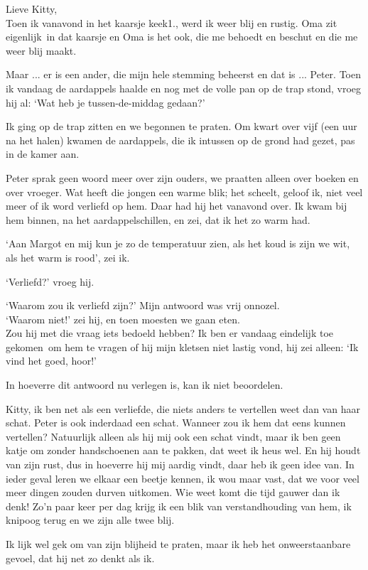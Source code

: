 \documentclass{book}
\begin{document}
Lieve Kitty,\\Toen ik vanavond in het kaarsje keek1., werd ik weer blij
en rustig. Oma zit eigenlijk~in dat kaarsje en Oma is het ook, die me
behoedt en beschut en die me weer blij maakt.

Maar ... er is een ander, die mijn hele stemming beheerst en dat is ...
Peter. Toen ik vandaag de aardappels haalde en nog met de volle pan op
de trap stond, vroeg hij al: `Wat heb je tussen-de-middag gedaan?'

Ik ging op de trap zitten en we begonnen te praten. Om kwart over vijf
(een uur na het halen) kwamen de aardappels, die ik intussen op de grond
had gezet, pas in de kamer aan.

Peter sprak geen woord meer over zijn ouders, we praatten alleen over
boeken en over vroeger. Wat heeft die jongen een warme blik; het
scheelt, geloof ik, niet veel meer of ik word verliefd op hem. Daar had
hij het vanavond over. Ik kwam bij hem binnen, na het aardappelschillen,
en zei, dat ik het zo warm had.

`Aan Margot en mij kun je zo de temperatuur zien, als het koud is zijn
we wit, als het warm is rood', zei ik.

`Verliefd?' vroeg hij.

`Waarom zou ik verliefd zijn?' Mijn antwoord was vrij onnozel.\\`Waarom
niet!' zei hij, en toen moesten we gaan eten.\\Zou hij met die vraag
iets bedoeld hebben? Ik ben er vandaag eindelijk toe gekomen~om hem te
vragen of hij mijn kletsen niet lastig vond, hij zei alleen: `Ik vind
het goed, hoor!'

In hoeverre dit antwoord nu verlegen is, kan ik niet beoordelen.

Kitty, ik ben net als een verliefde, die niets anders te vertellen weet
dan van haar schat. Peter is ook inderdaad een schat. Wanneer zou ik hem
dat eens kunnen vertellen? Natuurlijk alleen als hij mij ook een schat
vindt, maar ik ben geen katje om zonder handschoenen aan te pakken, dat
weet ik heus wel. En hij houdt van zijn rust, dus in hoeverre hij mij
aardig vindt, daar heb ik geen idee van. In ieder geval leren we elkaar
een beetje kennen, ik wou maar vast, dat we voor veel meer dingen zouden
durven uitkomen. Wie weet komt die tijd gauwer dan ik denk! Zo'n paar
keer per dag krijg ik een blik van verstandhouding van hem, ik knipoog
terug en we zijn alle twee blij.

Ik lijk wel gek om van zijn blijheid te praten, maar ik heb het
onweerstaanbare gevoel, dat hij net zo denkt als ik.
\end{document}
